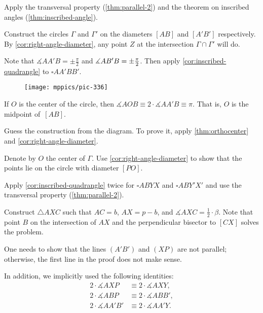 \begin{multicols}{2}
 Apply the transversal property (\ref{thm:parallel-2}) and the theorem on inscribed angles (\ref{thm:inscribed-angle}).

Construct the circles $\Gamma$ and $\Gamma'$
on the diameters $[AB]$ and $[A'B']$ respectively.
By \ref{cor:right-angle-diameter},
any point $Z$ at the intersection $\Gamma\cap \Gamma'$ will do.


Note that $\measuredangle AA'B=\pm\tfrac\pi2$ and $\measuredangle AB'B\z=\pm\tfrac\pi2$.
Then apply \ref{cor:inscribed-quadrangle}
to $\square AA'BB'$.

\begin{wrapfigure}[8]{r}{20mm}
\vskip-4mm
\centering
\texttt{[image: mppics/pic-336]}
\end{wrapfigure}

If $O$ is the center of the circle, then 
$\measuredangle AOB\equiv 2\cdot \measuredangle AA'B\equiv\pi$.
That is, $O$ is the midpoint of~$[AB]$.

Guess the construction from the diagram.
To prove it,
apply \ref{thm:orthocenter} and \ref{cor:right-angle-diameter}.

Denote by $O$ the center of $\Gamma$.
Use \ref{cor:right-angle-diameter} to show that the points lie on the circle with diameter $[PO]$.

Apply \ref{cor:inscribed-quadrangle} twice for $\square ABYX$ and $\square ABY'X'$ and use the transversal property (\ref{thm:parallel-2}).

Construct $\triangle AXC$ such that $AC=b$, $AX=p-b$, and $\measuredangle AXC=\tfrac12\cdot \beta$.
Note that point $B$ on the intersection of $AX$ and the perpendicular bisector to $[CX]$ solves the problem. 


One needs to show that the lines $(A'B')$ and $(XP)$ are not parallel; otherwise, the first line in the proof does not make sense.



In addition, we implicitly used the following identities:
\begin{align*}
2\cdot \measuredangle AXP&\equiv2\cdot \measuredangle AXY,
\\
2\cdot \measuredangle ABP&\equiv2\cdot \measuredangle ABB',
\\
2\cdot \measuredangle AA'B'&\equiv2\cdot \measuredangle AA'Y.
\end{align*}


\end{multicols}
